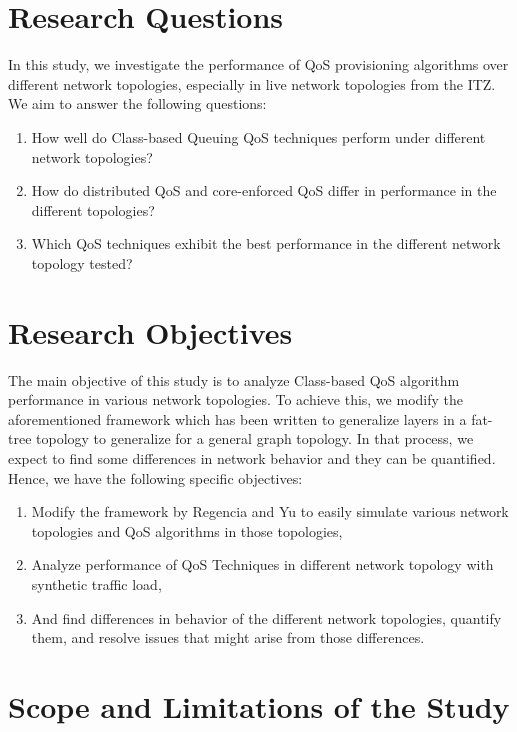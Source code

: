 \section{Research Questions}

In this study, we investigate the performance of QoS provisioning algorithms over different network topologies, especially in live network topologies from the ITZ. We aim to answer the following questions:

\begin{enumerate}
    \item How well do Class-based Queuing QoS techniques perform under different network topologies?
    \item How do distributed QoS and core-enforced QoS differ in performance in the different topologies?
    \item Which QoS techniques exhibit the best performance in the different network topology tested?
\end{enumerate}

\section{Research Objectives}

The main objective of this study is to analyze Class-based QoS algorithm performance in various network topologies. To achieve this, we modify the aforementioned framework which has been written to generalize layers in a fat-tree topology to generalize for a general graph topology. In that process, we expect to find some differences in network behavior and they can be quantified. Hence, we have the following specific objectives:

\begin{enumerate}
    \item Modify the framework by Regencia and Yu to easily simulate various network topologies and QoS algorithms in those topologies,
    \item Analyze performance of QoS Techniques in different network topology with synthetic traffic load,
    \item And find differences in behavior of the different network topologies, quantify them, and resolve issues that might arise from those differences.
\end{enumerate}


\section{Scope and Limitations of the Study}


